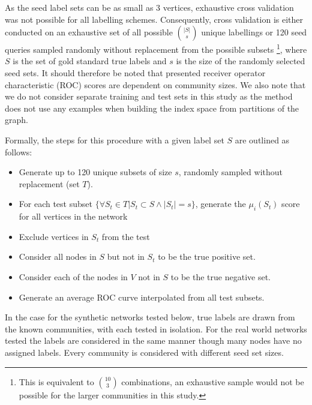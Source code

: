\documentclass[sigconf]{acmart}
\begin{document}
As the seed label sets can be as small as 3 vertices, exhaustive cross validation was not possible for all labelling schemes.
Consequently, cross validation is either conducted on an exhaustive set of all possible $\binom{|S|}{s}$ unique labellings or 120 seed queries sampled randomly without replacement from the possible subsets \footnote{This is equivalent to $\binom{10}{3}$ combinations, an exhaustive sample would not be possible for the larger communities in this study.}, where $S$ is the set of gold standard true labels and $s$ is the size of the randomly selected seed sets.
It should therefore be noted that presented receiver operator characteristic (ROC) scores are dependent on community sizes.
We also note that we do not consider separate training and test sets in this study as the method does not use any examples when building the index space from partitions of the graph.

Formally, the steps for this procedure with a given label set $S$ are outlined as follows:
\begin{itemize}
 \item Generate up to 120 unique subsets of size $s$, randomly sampled without replacement (set $T$).
 \item For each test subset $\{\forall S_t \in T | S_t \subset S \wedge |S_t| = s \}$, generate the $\mu_i(S_t)$ score for all vertices in the network
 \item Exclude vertices in $S_t$ from the test
 \item Consider all nodes in $S$ but not in $S_t$ to be the true positive set.
 \item Consider each of the nodes in $V$ not in $S$ to be the true negative set.
 \item Generate an average ROC curve interpolated from all test subsets.
 \end{itemize}

In the case for the synthetic networks tested below, true labels are drawn from the known communities, with each tested in isolation.
For the real world networks tested the labels are considered in the same manner though many nodes have no assigned labels.
Every community is considered with different seed set sizes.
 
\end{document}
